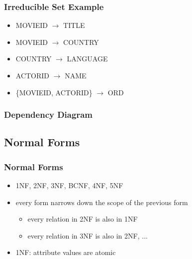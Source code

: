 \documentclass[dvipsnames]{beamer}
\begin{document}
\begin{frame}
  \frametitle{Irreducible Set Example}

  \begin{example}
    \begin{itemize}
      \item MOVIEID $\rightarrow$ TITLE
      \item MOVIEID $\rightarrow$ COUNTRY
      \item COUNTRY $\rightarrow$ LANGUAGE
      \item ACTORID $\rightarrow$ NAME
      \item \{MOVIEID, ACTORID\} $\rightarrow$ ORD
    \end{itemize}
  \end{example}
\end{frame}

\begin{frame}
  \frametitle{Dependency Diagram}

  \begin{example}
    \begin{center}
    \end{center}
  \end{example}
\end{frame}

\subsection{Normal Forms}

\begin{frame}
  \frametitle{Normal Forms}

  \begin{itemize}
    \item 1NF, 2NF, 3NF, BCNF, 4NF, 5NF

    \item every form narrows down the scope of the previous form
    \begin{itemize}
      \item every relation in 2NF is also in 1NF
      \item every relation in 3NF is also in 2NF, ...
    \end{itemize}

    \pause
    \medskip
    \item 1NF: attribute values are atomic
  \end{itemize}
\end{frame}
\end{document}
